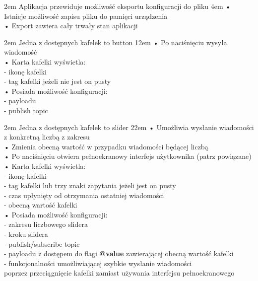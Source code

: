 {2em}{
    Aplikacja przewiduje możliwość eksportu konfiguracji do pliku
}
{4em}{
    • Istnieje możliwość zapisu pliku do pamięci urządzenia\\
    • Export zawiera cały trwały stan aplikacji
}

{2em}{
    Jedna z dostępnych kafelek to button
}
{12em}{
    • Po naciśnięciu wysyła wiadomość\\

    • Karta kafelki wyświetla:\\
    - ikonę kafelki\\
    - tag kafelki jeżeli nie jest on pusty\\

    • Posiada możliwość konfiguracji:\\
    - payloadu\\
    - publish topic
}

{2em}{
    Jedna z dostępnych kafelek to slider
}
{22em}{
    • Umożliwia wysłanie wiadomości z konkretną liczbą z zakresu\\
    • Zmienia obecną wartość w przypadku wiadomości będącej liczbą\\
    • Po naciśnięciu otwiera pełnoekranowy interfejs użytkownika (patrz powiązane)\\

    • Karta kafelki wyświetla:\\
    - ikonę kafelki\\
    - tag kafelki lub trzy znaki zapytania jeżeli jest on pusty\\
    - czas upłynięty od otrzymania ostatniej wiadomości\\
    - obecną wartość kafelki\\

    • Posiada możliwość konfiguracji:\\
    - zakresu liczbowego slidera\\
    - kroku slidera\\
    - publish/subscribe topic\\
    - payloadu z dostępem do flagi \textbf{@value} zawierającej obecną wartość kafelki\\
    - funkcjonalności umożliwiającej szybkie wysłanie wiadomości\\
    \hspace*{0.5em} poprzez przeciągnięcie kafelki zamiast używania interfejsu pełnoekranowego
}

